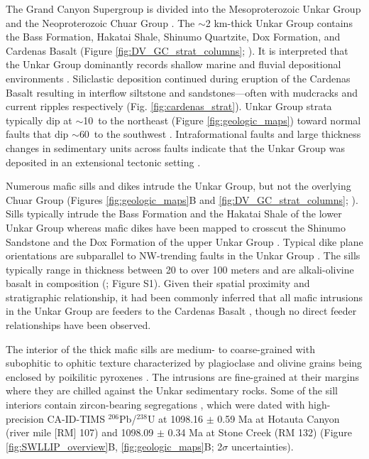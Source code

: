 The Grand Canyon Supergroup is divided into the Mesoproterozoic Unkar Group and the Neoproterozoic Chuar Group \citep{Gundy1951a, Elston1989a, Dehler2017a}. The $\sim$2 km-thick Unkar Group contains the Bass Formation, Hakatai Shale, Shinumo Quartzite, Dox Formation, and Cardenas Basalt (Figure \ref{fig:DV_GC_strat_columns}; \cite{Beus1974a, Elston1989a}). It is interpreted that the Unkar Group dominantly records shallow marine and fluvial depositional environments \citep{Elston1989a, Sears1990a, Hendricks1989a, Timmons2005a}. Siliclastic deposition continued during eruption of the Cardenas Basalt resulting in interflow siltstone and sandstones---often with mudcracks and current ripples respectively  (Fig. \ref{fig:cardenas_strat}). Unkar Group strata typically dip at $\sim$10\textdegree\ to the northeast (Figure \ref{fig:geologic_maps}) toward normal faults that dip $\sim$60\textdegree\ to the southwest \citep{Sears1973a, Timmons2012a}. Intraformational faults and large thickness changes in sedimentary units across faults indicate that the Unkar Group was deposited in an extensional tectonic setting \citep{Sears1990a, Karlstrom1998a, Timmons2001a}. 

Numerous mafic sills and dikes intrude the Unkar Group, but not the overlying Chuar Group (Figures \ref{fig:geologic_maps}B and \ref{fig:DV_GC_strat_columns}; \cite{Elston1989a}). Sills typically intrude the Bass Formation and the Hakatai Shale of the lower Unkar Group \citep{Hendricks1989a} whereas mafic dikes have been mapped to crosscut the Shinumo Sandstone and the Dox Formation of the upper Unkar Group \citep{Timmons2012a}. Typical dike plane orientations are subparallel to NW-trending faults in the Unkar Group \citep{Huntoon1996a, Timmons2012a}. The sills typically range in thickness between 20 to over 100 meters and are alkali-olivine basalt in composition (\cite{Hendricks1989a, Larson1994a}; Figure S1). Given their spatial proximity and stratigraphic relationship, it had been commonly inferred that all mafic intrusions in the Unkar Group are feeders to the Cardenas Basalt \cite[e.g.][]{Huntoon1996a, Timmons2012a}, though no direct feeder relationships have been observed.

The interior of the thick mafic sills are medium- to coarse-grained with subophitic to ophitic texture characterized by plagioclase and olivine grains being enclosed by poikilitic pyroxenes \citep{Hendricks1989a}. The intrusions are fine-grained at their margins where they are chilled against the Unkar sedimentary rocks.  Some of the sill interiors contain zircon-bearing segregations \citep{Mohr2024a}, which were dated with high-precision CA-ID-TIMS $^{206}$Pb/$^{238}$U at 1098.16 $\pm$ 0.59 Ma at Hotauta Canyon (river mile [RM] 107) and 1098.09 $\pm$ 0.34 Ma at Stone Creek (RM 132) (Figure \ref{fig:SWLLIP_overview}B, \ref{fig:geologic_maps}B; 2$\sigma$ uncertainties). 

